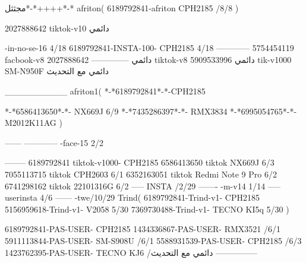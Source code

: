 مجثثل*-*++++*-*
afriton(
6189792841-afriton CPH2185  /8/8
)

2027888642 tiktok-v10
دائمي

-in-no-se-16 4/18
6189792841-INSTA-100- CPH2185 4/18
------------
5754454119 facbook-v8
دائمي
--------------
2027888642 tiktok-v8
دائمي
5909533996 tik-v1000  SM-N950F
دائمي مع التحديث

__________
afriton1(
*-*6189792841*-*-CPH2185

*-*6586413650*-*- NX669J  6/9
*-*7435286397*-*-   RMX3834  \5
*-*6995054765*-*-   M2012K11AG  \5
)


------
------------
-face-15 2/2

--------
6189792841 tiktok-v1000- CPH2185 
6586413650 tiktok NX669J  6/3
7055113715 tiktok  CPH2603   6/1
6352163051 tiktok  Redmi Note 9 Pro   6/2
6741298162 tiktok 22101316G  6/2
-----
 INSTA /2/29
-------
-m-v14 1/14
-----
userinsta 4/6
------
-twe/10/29
Trind(
6189792841-Trind-v1- CPH2185 
5156959618-Trind-v1- V2058   5/30
7369730488-Trind-v1- TECNO KI5q   5/30
)


6189792841-PAS-USER- CPH2185 
1434336867-PAS-USER-  RMX3521  /6/1
5911113844-PAS-USER-  SM-S908U  /6/1
5588931539-PAS-USER- CPH2185  /6/3
1423762395-PAS-USER- TECNO KJ6  /دائمي مع التحديث
    ---------------

